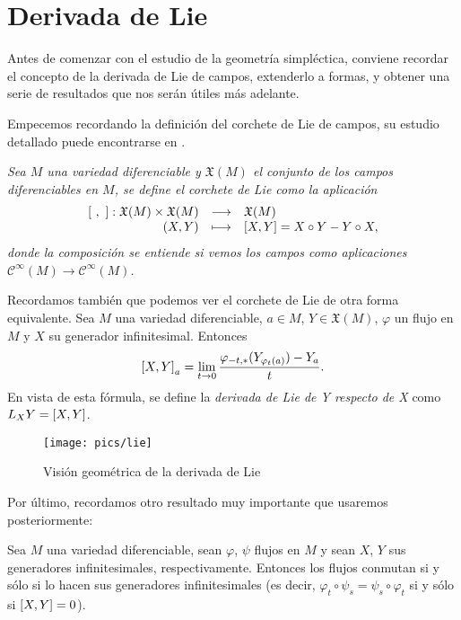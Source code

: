 \section{Derivada de Lie}\label{sec:lie}

Antes de comenzar con el estudio de la geometría simpléctica, conviene recordar el concepto de la derivada de Lie de campos, extenderlo a formas, y obtener una serie de resultados que nos serán útiles más adelante.

Empecemos recordando la definición del corchete de Lie de campos, su estudio detallado puede encontrarse en \cite{variedades}.

\begin{defn}
  \em
  Sea $M$ una variedad diferenciable y $\mathfrak{X}(M)$ el conjunto de los campos diferenciables en $M$, se define el \emph{corchete de Lie} como la aplicación
  \begin{equation*}
    \begin{array}{rcl}
    \left[\ ,\ \right]: \mathfrak{X}(M) \times \mathfrak{X}(M) & \longrightarrow & \mathfrak{X}(M) \\
    (X,Y) & \longmapsto & \left[X,Y\right] = X \circ Y - Y \circ X,
  \end{array}
  \end{equation*}
  donde la composición se entiende si vemos los campos como aplicaciones $\mathcal{C}^{\infty}(M) \rightarrow \mathcal{C}^{\infty}(M)$.
\end{defn}
Recordamos también que podemos ver el corchete de Lie de otra forma equivalente. Sea $M$ una variedad diferenciable, $a \in M$, $Y \in \mathfrak{X}(M)$, $\varphi$ un flujo en $M$ y $X$ su generador infinitesimal. Entonces
\begin{equation*}
  \left[X,Y\right]_a= \lim_{t\rightarrow 0}\frac{\varphi_{-t,*}(Y_{\varphi_t(a)})-Y_a}{t}.
\end{equation*}
En vista de esta fórmula, se define la \emph{derivada de Lie de Y respecto de X} como $L_XY=\left[X,Y\right]$. 
\begin{figure}[h]
  \centering
  \texttt{[image: pics/lie]}
  \caption{Visión geométrica de la derivada de Lie}
  \label{fig:lie}
\end{figure}
Por último, recordamos otro resultado muy importante que usaremos posteriormente:
\begin{prop}
  Sea $M$ una variedad diferenciable, sean $\varphi$, $\psi$ flujos en $M$ y sean $X$, $Y$ sus generadores infinitesimales, respectivamente. Entonces los flujos conmutan si y sólo si lo hacen sus generadores infinitesimales (es decir, $\varphi_t \circ \psi_s = \psi_s \circ \varphi_t$ si y sólo si $\left[X,Y\right]=0$).
\end{prop} 

